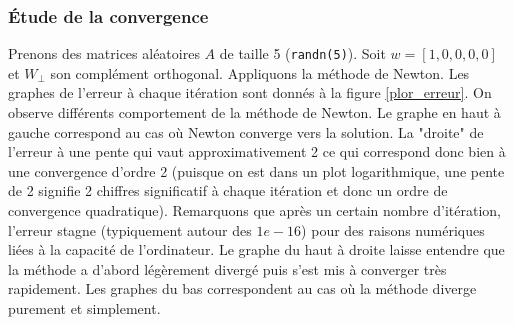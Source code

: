\subsubsection*{Étude de la convergence}
Prenons des matrices aléatoires $A$ de taille 5 (\texttt{randn(5)}). Soit $w=[1,0,0,0,0]$ et $W_{\bot}$ son complément orthogonal. Appliquons la méthode de Newton. Les graphes de l'erreur à chaque itération sont donnés à la figure \ref{plor_erreur}. On observe différents comportement de la méthode de Newton. Le graphe en haut à gauche correspond au cas où Newton converge vers la solution. La "droite" de l'erreur à une pente qui vaut approximativement 2 ce qui correspond donc bien à une convergence d'ordre 2 (puisque on est dans un plot logarithmique, une pente de 2 signifie 2 chiffres significatif à chaque itération et donc un ordre de convergence quadratique). Remarquons que après un certain nombre d'itération, l'erreur stagne (typiquement autour des $1e-16$) pour des raisons numériques liées à la capacité de l'ordinateur. Le graphe du haut à droite laisse entendre que la méthode a d'abord légèrement divergé puis s'est mis à converger très rapidement. Les graphes du bas correspondent au cas où la méthode diverge purement et simplement.


